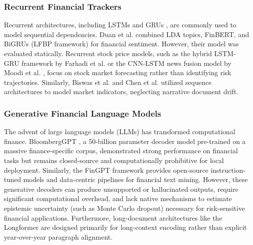 \documentclass[pdflatex,sn-basic,Numbered]{sn-jnl}
\begin{document}
\subsubsection{Recurrent Financial Trackers}
Recurrent architectures, including LSTMs \cite{hochreiter1997} and GRUs \cite{cho2014}, are commonly used to model sequential dependencies. Duan et al. \cite{duan2024} combined LDA topics, FinBERT, and BiGRUs (LFBP framework) for financial sentiment. However, their model was evaluated statically. Recurrent stock price models, such as the hybrid LSTM-GRU framework by Farhadi et al. \cite{farhadi2025} or the CNN-LSTM news fusion model by Moodi et al. \cite{moodi2024}, focus on stock market forecasting rather than identifying risk trajectories. Similarly, Biswas et al. \cite{biswas2025} and Chen et al. \cite{chen2024} utilized sequence architectures to model market indicators, neglecting narrative document drift.

\subsubsection{Generative Financial Language Models}
The advent of large language models (LLMs) has transformed computational finance. BloombergGPT \cite{wu2023bloomberggpt}, a 50-billion parameter decoder model pre-trained on a massive finance-specific corpus, demonstrated strong performance on financial tasks but remains closed-source and computationally prohibitive for local deployment. Similarly, the FinGPT framework \cite{yang2023fingpt, li2023fingpt} provides open-source instruction-tuned models and data-centric pipelines for financial text mining. However, these generative decoders can produce unsupported or hallucinated outputs, require significant computational overhead, and lack native mechanisms to estimate epistemic uncertainty (such as Monte Carlo dropout) necessary for risk-sensitive financial applications. Furthermore, long-document architectures like the Longformer \cite{beltagy2020longformer} are designed primarily for long-context encoding rather than explicit year-over-year paragraph alignment.
\end{document}
